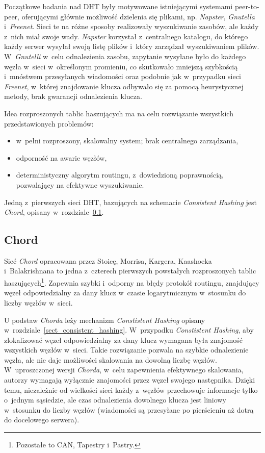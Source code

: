 \documentclass[a4paper,11pt]{scrartcl}
\begin{document}
Początkowe badania nad DHT były motywowane istniejącymi systemami peer-to-peer, oferującymi głównie możliwość dzielenia się plikami, np. \textit{Napster}, \textit{Gnutella} i~\textit{Freenet}. Sieci te na różne sposoby realizowały wyszukiwanie zasobów, ale każdy z~nich miał swoje wady. \textit{Napster} korzystał z~centralnego katalogu, do którego każdy serwer wysyłał swoją listę plików i~który zarządzał wyszukiwaniem plików. W~\textit{Gnutelli} w~celu odnalezienia zasobu, zapytanie wysyłane było do każdego węzła w~sieci w~określonym promieniu, co skutkowało mniejszą szybkością i~mnóstwem przesyłanych wiadomości oraz podobnie jak w~przypadku sieci \textit{Freenet}, w~której znajdowanie klucza odbywało się za pomocą heurystycznej metody, brak gwarancji odnalezienia klucza.

Idea rozproszonych tablic haszujących ma na celu rozwiązanie wszystkich przedstawionych problemów:
\begin{itemize}
  \item w~pełni rozproszony, skalowalny system; brak centralnego zarządzania,
  \item odporność na awarie węzłów,
  \item deterministyczny algorytm routingu, z~dowiedzioną poprawnością, pozwalający na efektywne wyszukiwanie. 
\end{itemize} 

Jedną z~pierwszych sieci DHT, bazujących na schemacie \textit{Consistent Hashing} jest \textit{Chord}, opisany w~rozdziale~\ref{sect_dht_chord}.

\subsection{Chord}
\label{sect_dht_chord}
Sieć \textit{Chord} opracowana przez Stoicę, Morrisa, Kargera, Kaashoeka i~Balakrishnana  \cite{stoica2001chord} to jedna z~czterech pierwszych powstałych rozproszonych tablic haszujących\footnote{Pozostałe to CAN\cite{ratnasamy2001scalable}, Tapestry \cite{zhao2001tapestry} i~Pastry\cite{rowstron2001pastry}.}. Zapewnia szybki i~odporny na błędy protokół routingu, znajdujący węzeł odpowiedzialny za dany klucz w~czasie logarytmicznym w~stosunku do liczby węzłów w~sieci.

U podstaw \textit{Chorda} leży mechanizm \textit{Constistent Hashing} opisany w~rozdziale~\ref{sect_consistent_hashing}. W~przypadku \textit{Constistent Hashing}, aby zlokalizować węzeł odpowiedzialny za dany klucz wymagana była znajomość wszystkich węzłów w~sieci. Takie rozwiązanie pozwala na szybkie odnalezienie węzła, ale nie daje możliwości skalowania na dowolną liczbę węzłów. W~uproszczonej wersji \textit{Chorda}, w~celu zapewnienia efektywnego skalowania, autorzy wymagają wyłącznie znajomości przez węzeł swojego następnika. Dzięki temu, niezależnie od wielkości sieci każdy z~węzłów przechowuje informacje tylko o~jednym sąsiedzie, ale czas odnalezienia dowolnego klucza jest liniowy w~stosunku do liczby węzłów (wiadomości są przesyłane po pierścieniu aż dotrą do docelowego serwera).
\end{document}
